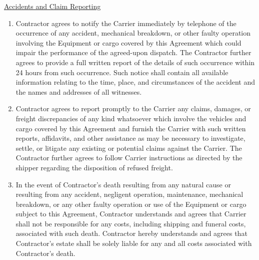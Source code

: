 \underline{Accidents and Claim Reporting}
\begin{enumerate}[
    ref = \SecondLevelEnumerator
]
    \item Contractor agrees to notify the Carrier immediately by telephone
    of the occurrence of any accident, mechanical breakdown, or other
    faulty operation involving the Equipment or cargo covered by this
    Agreement which could impair the performance of the agreed-upon
    dispatch. The Contractor further agrees to provide a full written
    report of the details of such occurrence within 24 hours from such
    occurrence. Such notice shall contain all available information
    relating to the time, place, and circumstances of the accident and the
    names and addresses of all witnesses.

    \item Contractor agrees to report promptly to the Carrier any claims,
    damages, or freight discrepancies of any kind whatsoever which involve
    the vehicles and cargo covered by this Agreement and furnish the
    Carrier with such written reports, affidavits, and other assistance as
    may be necessary to investigate, settle, or litigate any existing or
    potential claims against the Carrier. The Contractor further agrees to
    follow Carrier instructions as directed by the shipper regarding the
    disposition of refused freight.

    \item In the event of Contractor's death resulting from any natural
    cause or resulting from any accident, negligent operation, maintenance,
    mechanical breakdown, or any other faulty operation or use of the
    Equipment or cargo subject to this Agreement, Contractor understands
    and agrees that Carrier shall not be responsible for any costs,
    including shipping and funeral costs, associated with such death.
    Contractor hereby understands and agrees that Contractor's estate shall
    be solely liable for any and all costs associated with Contractor's
    death.
\end{enumerate}